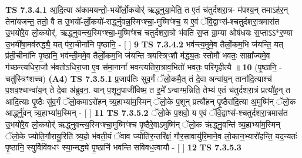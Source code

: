 \documentclass[17pt]{extarticle}
\begin{document}
                                        \textbf{ TS 7.3.4.1} \newline
                  आ॒दि॒त्या अ॑कामयन्तो॒-भयो᳚र्लो॒कयोर्॑ ऋद्ध्नुया॒मेति॒ त ए॒तं च॑तुर्दशरा॒त्र- म॑पश्य॒न् तमाऽह॑र॒न् तेना॑यजन्त॒ ततो॒ वै त उ॒भयो᳚-र्लो॒कयो॑-रार्द्ध्नुवन्न॒स्मिꣳश्चा॒-मुष्मिꣳ॑श्च॒ य ए॒वं ॅवि॒द्वाꣳस॑-श्चतुर्दशरा॒त्रमास॑त उ॒भयो॑रे॒व लो॒कयोर्॑. ऋद्ध्नुवन्त्य॒स्मिꣳश्चा॒-मुष्मिꣳ॑श्च चतुर्दशरा॒त्रो भ॑वति स॒प्त ग्रा॒म्या ओष॑धयः स॒प्ताऽऽ*र॒ण्या उ॒भयी॑षा॒मव॑रुद्ध्यै॒ यत् प॑रा॒चीना॑नि पृ॒ष्ठानि॒ - [  ] \textbf{  9} \newline
                  \newline
                                \textbf{ TS 7.3.4.2} \newline
                  भव॑न्त्य॒मुमे॒व तैर्लो॒कम॒भि ज॑यन्ति॒ यत् प्र॑ती॒चीना॑नि पृ॒ष्ठानि॒ भव॑न्ती॒ममे॒व तैर्लो॒कम॒भि ज॑यन्ति त्रयस्त्रिꣳ॒॒शौ म॑द्ध्य॒तः स्तोमौ॑ भवतः॒ साम्रा᳚ज्यमे॒व ग॑च्छन्त्यधिरा॒जौ भ॑वतोऽधिरा॒जा ए॒व स॑मा॒नानां᳚ भवन्त्यतिरा॒त्राव॒भितो॑ भवतः॒ परि॑गृहीत्यै ॥ \textbf{  10} \newline
                  \newline
                      (पृ॒ष्ठानि॒ - चतु॑स्त्रिꣳशच्च)  \textbf{(A4)} \newline \newline
                                        \textbf{ TS 7.3.5.1} \newline
                  प्र॒जाप॑तिः सुव॒र्गं ॅलो॒कमै॒त् तं दे॒वा अन्वा॑य॒न् ताना॑दि॒त्याश्च॑ प॒शव॒श्चान्वा॑य॒न् ते दे॒वा अ॑ब्रुव॒न॒. यान् प॒शूनु॒पाजी॑विष्म॒ त इ॒मे᳚ ऽन्वाग्म॒न्निति॒ तेभ्य॑ ए॒तं च॑तुर्दशरा॒त्रं प्रत्यौ॑ह॒न् त आ॑दि॒त्याः पृ॒ष्ठैः सु॑व॒र्गं ॅलो॒कमाऽरो॑हन् त्र्य॒हाभ्या॑म॒स्मिन् ॅलो॒के प॒शून् प्रत्यौ॑हन् पृ॒ष्ठैरा॑दि॒त्या अ॒मुष्मि॑न् ॅलो॒क आर्द्ध्नु॑वन् त्र्य॒हाभ्या॑म॒स्मिन् - [  ] \textbf{  11} \newline
                  \newline
                                \textbf{ TS 7.3.5.2} \newline
                  ॅलो॒के प॒शवो॒ य ए॒वं ॅवि॒द्वाꣳस॑-श्चतुर्दशरा॒त्रमास॑त उ॒भयो॑रे॒व लो॒कयोर्॑ ऋद्ध्नुवन्त्य॒स्मिꣳश्चा॒मुष्मिꣳ॑श्च पृ॒ष्ठैरे॒वाऽमुष्मि॑न् ॅलो॒क ऋ॑द्ध्नु॒वन्ति॑ त्र्य॒हाभ्या॑म॒स्मिन् ॅलो॒के ज्योति॒र्गौरायु॒रिति॑ त्र्य॒हो भ॑वती॒यं ॅवाव ज्योति॑र॒न्तरि॑क्षं॒ गौर॒सावायु॑रि॒माने॒व लो॒कान॒भ्यारो॑हन्ति॒ यद॒न्यतः॑ पृ॒ष्ठानि॒ स्युर्विवि॑वधꣳ स्या॒न्मद्ध्ये॑ पृ॒ष्ठानि॑ भवन्ति सविवध॒त्वायौ - [  ] \textbf{  12} \newline
                  \newline
                                \textbf{ TS 7.3.5.3} \newline
\end{document}
